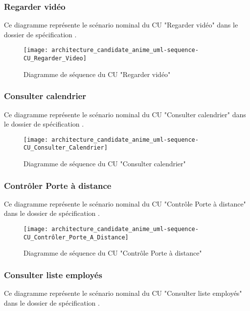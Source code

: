 \subsubsection{Regarder vidéo} %
Ce diagramme représente le scénario nominal du CU "Regarder vidéo" dans le dossier de spécification .\\

\begin{figure} [H]
    \centering
    \texttt{[image: architecture\_candidate\_anime\_uml-sequence-CU\_Regarder\_Video]}
    \caption{Diagramme de séquence du CU "Regarder vidéo"}
    \label{CU-Regarder_Video}
\end{figure}

\subsubsection{Consulter calendrier} %
Ce diagramme représente le scénario nominal du CU "Consulter calendrier" dans le dossier de spécification .\\

\begin{figure} [H]
    \centering
    \texttt{[image: architecture\_candidate\_anime\_uml-sequence-CU\_Consulter\_Calendrier]}
    \caption{Diagramme de séquence du CU "Consulter calendrier"}
    \label{CU-Consulter_Calendrier}
\end{figure}

\subsubsection{Contrôler Porte à distance} %
Ce diagramme représente le scénario nominal du CU "Contrôle Porte à distance" dans le dossier de spécification .\\

\begin{figure} [H]
    \centering
    \texttt{[image: architecture\_candidate\_anime\_uml-sequence-CU\_Contrôler\_Porte\_A\_Distance]}
    \caption{Diagramme de séquence du CU "Contrôle Porte à distance"}
    \label{CU-Contrôler_Porte_A_Distance}
\end{figure}

\subsubsection{Consulter liste employés} %
Ce diagramme représente le scénario nominal du CU "Consulter liste employés" dans le dossier de spécification .\\

